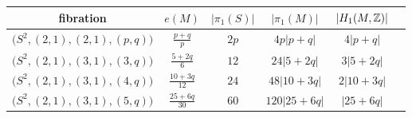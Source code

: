 \begin{table}
\begin{center}
\begin{tabular}{c||ccccc}
\phantom{\Big|} fibration        & $e(M)$ & $|\pi_1(S)|$ & $|\pi_1(M)|$ & $|H_1(M,\mathbb{Z})|$ \\
 \hline \hline
\phantom{\Big|} $\big(S^2,(2,1),(2,1),(p,q)\big)$ & $\frac {p+q}p$ & $2p$ & $4p|p+q|$ & $4|p+q|$ \\
\phantom{\Big|} $\big(S^2,(2,1),(3,1),(3,q)\big)$ & $\frac{5+2q}6$ & $12$ & $24|5+2q|$ & $3|5+2q|$ \\
\phantom{\Big|} $\big(S^2,(2,1),(3,1),(4,q)\big)$ & $\frac{10+3q}{12}$ & $24$ & $48|10+3q|$ & $2|10+3q|$ \\
\phantom{\Big|} $\big(S^2,(2,1),(3,1),(5,q)\big)$ & $\frac{25+6q}{30}$ & $60$ & $120|25+6q|$ & $|25+6q|$
\end{tabular}
\vspace{.2 cm}
\label{elliptic:table}
\end{center}
\end{table}

